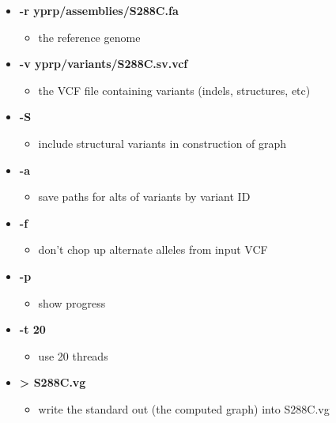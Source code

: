 \documentclass[
]{book}
\providecommand{\tightlist}{%
  \setlength{\itemsep}{0pt}\setlength{\parskip}{0pt}}
\begin{document}
\begin{itemize}
\tightlist
\item
  \textbf{-r yprp/assemblies/S288C.fa}

  \begin{itemize}
  \tightlist
  \item
    the reference genome
  \end{itemize}
\item
  \textbf{-v yprp/variants/S288C.sv.vcf}

  \begin{itemize}
  \tightlist
  \item
    the VCF file containing variants (indels, structures, etc)
  \end{itemize}
\item
  \textbf{-S}

  \begin{itemize}
  \tightlist
  \item
    include structural variants in construction of graph
  \end{itemize}
\item
  \textbf{-a}

  \begin{itemize}
  \tightlist
  \item
    save paths for alts of variants by variant ID
  \end{itemize}
\item
  \textbf{-f}

  \begin{itemize}
  \tightlist
  \item
    don't chop up alternate alleles from input VCF
  \end{itemize}
\item
  \textbf{-p}

  \begin{itemize}
  \tightlist
  \item
    show progress
  \end{itemize}
\item
  \textbf{-t 20}

  \begin{itemize}
  \tightlist
  \item
    use 20 threads
  \end{itemize}
\item
  \textbf{\textgreater{} S288C.vg}

  \begin{itemize}
  \tightlist
  \item
    write the standard out (the computed graph) into S288C.vg
  \end{itemize}
\end{itemize}
\end{document}
